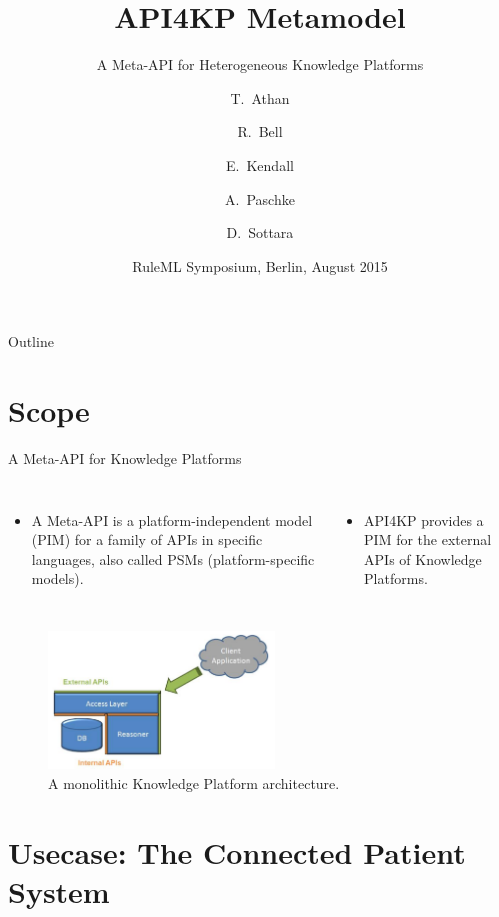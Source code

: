 \documentclass{beamer}
\title{API4KP Metamodel}
\subtitle{A Meta-API for Heterogeneous Knowledge Platforms}
\author{T.~Athan\inst{1} 
\and R.~Bell\inst{2}
\and E.~Kendall\inst{3}
\and A.~Paschke\inst{4}
\and D.~Sottara\inst{5}
}
\institute[Athan Serv/Raytheon/Thematix/FUB/ASU] %
{
 \inst{1}%
 Athan Services (athant.com), West Lafayette, Indiana, USA
\and
 \inst{2}%
 Raytheon, Fort Wayne, Indiana, USA
\and
 \inst{3}%
 Thematix Partners LLC, New York, New York, USA
\and
 \inst{4}%
 AG Corporate Semantic Web, Freie Universitaet Berlin, Germany
\and
 \inst{5}%
 Department of Biomedical Informatics, Arizona State University, USA
}
\date{RuleML Symposium, Berlin, August 2015}
\begin{document}
\begin{frame}
  \titlepage
\end{frame}

\begin{frame}{Outline}
  \tableofcontents
\end{frame}

\section{Scope}
\begin{frame}{A Meta-API for Knowledge Platforms}

\begin{columns}[c]
\column{2.2in}
\begin{itemize}
\item A Meta-API is a platform-independent model (PIM) for a family of APIs in specific languages, also called PSMs (platform-specific models).
\end{itemize}
\column{1.5in}
\begin{itemize}
\item API4KP provides a PIM for the external APIs of Knowledge Platforms.
\end{itemize}
\end{columns}
\begin{figure}[ht!]
\centering
\includegraphics[width=60mm]{diagrams/SimpleKnowledgePlatformArchitecture.png}
\caption{A monolithic Knowledge Platform architecture.}
\end{figure}  

\end{frame}


\section{Usecase: The Connected Patient System}
\end{document}
